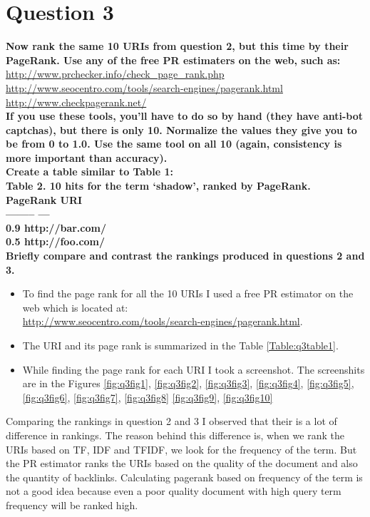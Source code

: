 \chapter{Question 3}
\label{available-representation}

\textbf{Now rank the same 10 URIs from question 2, but this time  by their PageRank.  Use any of the free PR estimaters on the web, such as: }
\url{http://www.prchecker.info/check_page_rank.php}\\
\url{http://www.seocentro.com/tools/search-engines/pagerank.html}\\
\url{http://www.checkpagerank.net/}\\
\textbf{If you use these tools, you'll have to do so by hand (they have anti-bot captchas), but there is only 10.  Normalize the values they give you to be from 0 to 1.0.  Use the same tool on all 10 (again, consistency is more important than accuracy).\\
Create a table similar to Table 1:\\
Table 2.  10 hits for the term `shadow', ranked by PageRank.\\
PageRank \qquad\qquad	URI\\
-------- \qquad\qquad\qquad	---\\
0.9	 \qquad \qquad	http://bar.com/\\
0.5	\qquad \qquad	http://foo.com/\\
Briefly compare and contrast the rankings produced in questions 2 and 3. }

\begin{itemize}
\item  To find the page rank for all the 10 URIs I used a free PR estimator on the web which is located at: \\
{\url{http://www.seocentro.com/tools/search-engines/pagerank.html}}. 
\item The URI and its page rank is summarized in the Table \ref{Table:q3table1}.
\item While finding the page rank for each URI I took a screenshot. The screenshits are in the Figures \ref{fig:q3fig1},  \ref{fig:q3fig2},  \ref{fig:q3fig3},  \ref{fig:q3fig4},  \ref{fig:q3fig5},  \ref{fig:q3fig6},  \ref{fig:q3fig7},  \ref{fig:q3fig8} \ref{fig:q3fig9},  \ref{fig:q3fig10}
\end{itemize}

Comparing the rankings in question 2 and 3 I observed that their is a lot of difference in rankings. The reason behind this difference is, when we rank the URIs based on TF, IDF and TFIDF, we look for the frequency of the term. But the PR estimator ranks the URIs based on the quality of the document and also the quantity of backlinks. Calculating pagerank based on frequency of the term is not a good idea because even a poor quality document with high query term frequency will be ranked high. 

